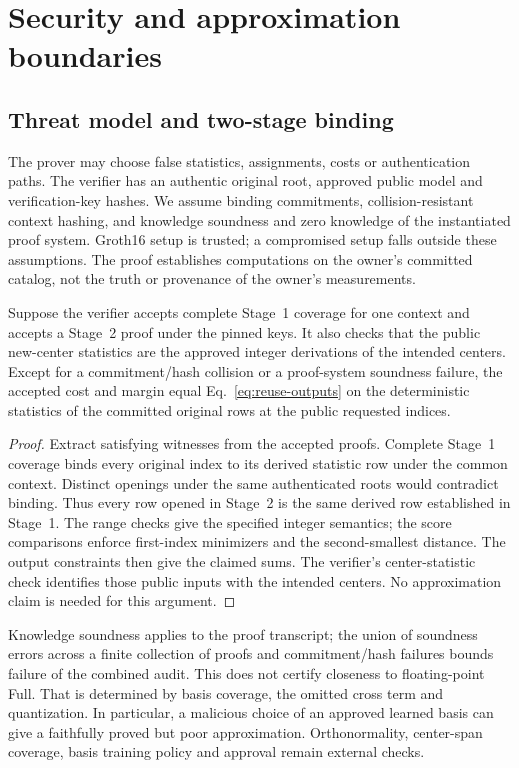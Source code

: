 \section{Security and approximation boundaries}\label{sec:security}
\subsection{Threat model and two-stage binding}
The prover may choose false statistics, assignments, costs or authentication paths. The verifier has an authentic original root, approved public model and verification-key hashes. We assume binding commitments, collision-resistant context hashing, and knowledge soundness and zero knowledge of the instantiated proof system. Groth16 setup is trusted; a compromised setup falls outside these assumptions. The proof establishes computations on the owner's committed catalog, not the truth or provenance of the owner's measurements.

\begin{theorem}\label{thm:binding}
Suppose the verifier accepts complete Stage~1 coverage for one context and accepts a Stage~2 proof under the pinned keys. It also checks that the public new-center statistics are the approved integer derivations of the intended centers. Except for a commitment/hash collision or a proof-system soundness failure, the accepted cost and margin equal Eq.~\eqref{eq:reuse-outputs} on the deterministic statistics of the committed original rows at the public requested indices.
\end{theorem}
\begin{proof}
Extract satisfying witnesses from the accepted proofs. Complete Stage~1 coverage binds every original index to its derived statistic row under the common context. Distinct openings under the same authenticated roots would contradict binding. Thus every row opened in Stage~2 is the same derived row established in Stage~1. The range checks give the specified integer semantics; the score comparisons enforce first-index minimizers and the second-smallest distance. The output constraints then give the claimed sums. The verifier's center-statistic check identifies those public inputs with the intended centers. No approximation claim is needed for this argument.
\end{proof}

Knowledge soundness applies to the proof transcript; the union of soundness errors across a finite collection of proofs and commitment/hash failures bounds failure of the combined audit. This does not certify closeness to floating-point Full. That is determined by basis coverage, the omitted cross term and quantization. In particular, a malicious choice of an approved learned basis can give a faithfully proved but poor approximation. Orthonormality, center-span coverage, basis training policy and approval remain external checks.

